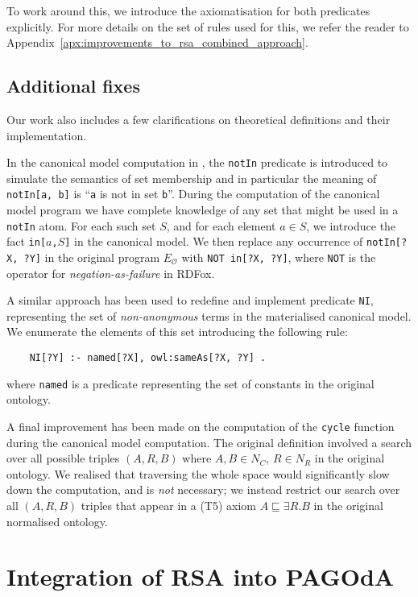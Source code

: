 \documentclass[runningheads]{llncs}
\newcommand{\rdfox}{\mbox{RDFox}\xspace}
\begin{document}
To work around this, we introduce the axiomatisation for both predicates explicitly.
For more details on the set of rules used for this, we refer the reader to Appendix~\ref{apx:improvements_to_rsa_combined_approach}.

\subsection{Additional fixes}\label{ssec:fixes}

Our work also includes a few clarifications on theoretical definitions and their implementation.

In the canonical model computation in \cite{feier2015}, the \texttt{notIn} predicate is introduced to simulate the semantics of set membership and in particular the meaning of \texttt{notIn[a, b]} is ``\texttt{a} is not in set \texttt{b}''.
During the computation of the canonical model program we have complete knowledge of any set that might be used in a \texttt{notIn} atom.
For each such set $S$, and for each element $a \in S$, we introduce the fact \texttt{in[$a$,$S$]} in the canonical model.
We then replace any occurrence of \texttt{notIn[?X, ?Y]} in the original program $E_\mathcal{O}$ with \texttt{NOT in[?X, ?Y]}, where \texttt{NOT} is the operator for \emph{negation-as-failure} in \rdfox.

A similar approach has been used to redefine and implement predicate \texttt{NI}, representing the set of \emph{non-anonymous} terms in the materialised canonical model.
We enumerate the elements of this set introducing the following rule:
\begin{verbatim}
    NI[?Y] :- named[?X], owl:sameAs[?X, ?Y] .
\end{verbatim}
where \texttt{named} is a predicate representing the set of constants in the original ontology. 

A final improvement has been made on the computation of the \texttt{cycle} function during the canonical model computation.
The original definition involved a search over all possible triples $(A, R, B)$ where $A, B \in N_C$, $R \in N_R$ in the original ontology.
We realised that traversing the whole space would significantly slow down the computation, and is \emph{not} necessary;
we instead restrict our search over all $(A, R, B)$ triples that appear in a (T5) axiom $A \sqsubseteq \exists R . B$ in the original normalised ontology.

\section{Integration of RSA into PAGOdA}\label{sec:integration_of_rsa_into_pagoda}
\end{document}
